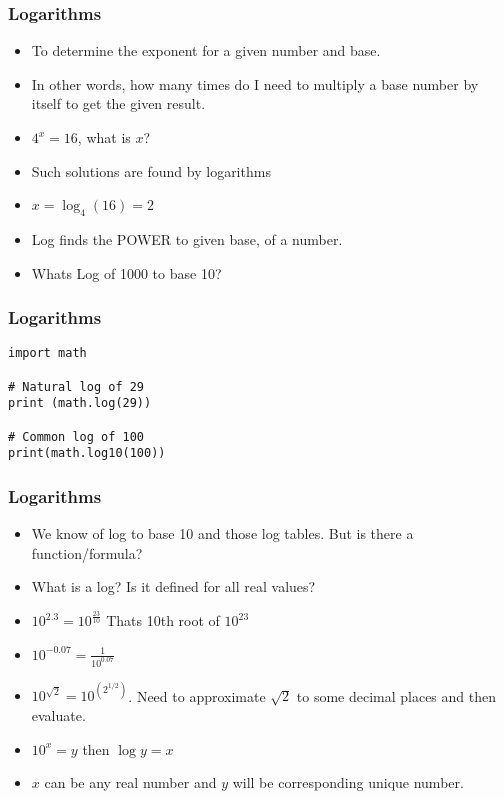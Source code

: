  \begin{frame}[fragile]\frametitle{Logarithms}

\begin{itemize}
\item To determine the exponent for a given number and base. 
\item In other words, how many times do I need to multiply a base number by itself to get the given result.
\item $4^x =16$, what is $x$?
\item Such solutions are found by logarithms
\item $x = \log_4 (16) = 2$
\item Log finds the POWER to given base, of a number.
\item Whats Log of 1000 to base 10?
\end{itemize}
\end{frame}

 \begin{frame}[fragile]\frametitle{Logarithms}
\begin{lstlisting}
import math

# Natural log of 29
print (math.log(29))

# Common log of 100
print(math.log10(100))
\end{lstlisting}
\end{frame}


 \begin{frame}[fragile]\frametitle{Logarithms}
\begin{itemize}
\item We know of log to base 10 and those log tables. But is there  a function/formula?
\item What is a log? Is it defined for all real values?
\item $10^{2.3} = 10^{\frac{23}{10}}$ Thats 10th root of $10^{23}$
\item $10^{-0.07} = \frac{1}{10^{0.07}}$
\item $10^{\sqrt{2}} = 10^{(2^{1/2})}$. Need to approximate $\sqrt{2}$ to some decimal places and then evaluate.
\item $10^x= y$ then $\log y = x$
\item $x$ can be any real number and $y$ will be corresponding unique number.
\end{itemize}
\end{frame}


